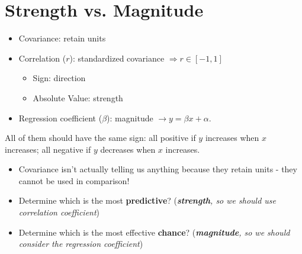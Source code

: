 \documentclass[10pt, letterpaper]{article}
\begin{document}
\section{Strength vs. Magnitude}
\begin{itemize}
	\item Covariance: retain units
	\item Correlation ($r$): standardized covariance $\Rightarrow r\in[-1,1]$
	\begin{itemize}
		\item Sign: direction
		\item Absolute Value: strength
	\end{itemize}
	\item Regression coefficient ($\beta$): magnitude $\rightarrow y=\beta x+\alpha$.
\end{itemize}
All of them should have the same sign: all positive if $y$ increases when $x$ increases; all negative if $y$ decreases when $x$ increases. 
\begin{itemize}
	\item Covariance isn't actually telling us anything because they retain units - they cannot be used in comparison! 
	\item Determine which is the most \textbf{predictive}? (\textit{\textbf{strength}, so we should use correlation coefficient})
	\item Determine which is the most effective \textbf{chance}? (\textit{\textbf{magnitude}, so we should consider the regression coefficient})
\end{itemize}
\end{document}
